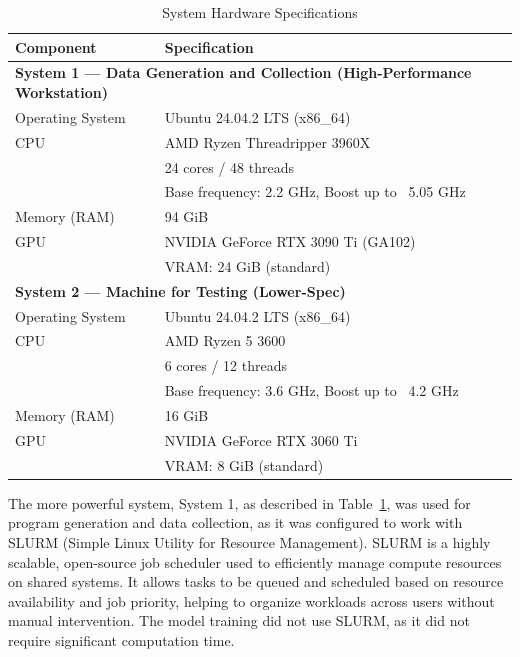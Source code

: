 \begin{table}[htbp]
\centering
\caption{System Hardware Specifications}
\begin{tabular}{|l|p{10cm}|}
\hline
\textbf{Component} & \textbf{Specification} \\
\hline
\multicolumn{2}{|l|}{\textbf{System 1 — Data Generation and Collection (High-Performance Workstation)}} \\
\hline
Operating System & Ubuntu 24.04.2 LTS (x86\_64) \\
\hline
CPU & AMD Ryzen Threadripper 3960X \\
     & 24 cores / 48 threads \\
     & Base frequency: 2.2 GHz, Boost up to ~5.05 GHz \\
\hline
Memory (RAM) & 94 GiB \\
\hline
GPU & NVIDIA GeForce RTX 3090 Ti (GA102) \\
    & VRAM: 24 GiB (standard) \\
\hline

\multicolumn{2}{|l|}{\textbf{System 2 — Machine for Testing (Lower-Spec)}} \\
\hline
Operating System & Ubuntu 24.04.2 LTS (x86\_64) \\
\hline
CPU & AMD Ryzen 5 3600 \\
     & 6 cores / 12 threads \\
     & Base frequency: 3.6 GHz, Boost up to ~4.2 GHz \\
\hline
Memory (RAM) & 16 GiB \\
\hline
GPU & NVIDIA GeForce RTX 3060 Ti \\
    & VRAM: 8 GiB (standard) \\
\hline
\end{tabular}
\label{tab:hardware_specs}
\end{table}

The more powerful system, System 1, as described in Table~\ref{tab:hardware_specs}, was used for program generation and data collection, as it was configured to work with SLURM (Simple Linux Utility for Resource Management). SLURM is a highly scalable, open-source job scheduler used to efficiently manage compute resources on shared systems. It allows tasks to be queued and scheduled based on resource availability and job priority, helping to organize workloads across users without manual intervention. The model training did not use SLURM, as it did not require significant computation time.




